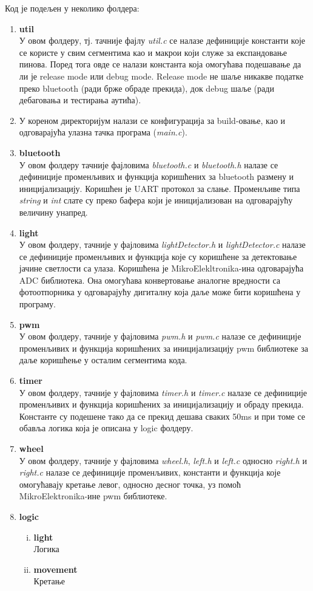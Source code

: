 Код је подељен у неколико фолдера:
\begin{enumerate}[1.]
	\item \textbf{util}\\
	У овом фолдеру, тј. тачније фајлу \textit{util.c} се налазе дефиниције константи које се користе у свим сегментима као и макрои који служе за експандовање пинова. Поред тога овде се налази константа која омогућава подешавање да ли је release mode или debug mode. Release mode не шаље никакве податке преко bluetooth (ради брже обраде прекида), док debug шаље (ради дебаговања и тестирања аутића). 
	\item \textbf{}
		У кореном директоријум налази се конфигурација за build-овање, као и одговарајућа улазна тачка програма (\textit{main.c}). 
	\item \textbf{bluetooth}\\
		У овом фолдеру тачније фајловима \textit{bluetooth.c} и \textit{bluetooth.h} налазе се дефиниције променљивих и функција коришћених за bluetooth размену и иницијализацију. Коришћен је UART протокол за слање. Променљиве типа \textit{string }и \textit{int } слате су преко бафера који је иницијализован на одговарајућу величину унапред.
	\item \textbf{light}\\
	У овом фолдеру, тачније у фајловима \textit{lightDetector.h} и \textit{lightDetector.c} налазе се дефиниције променљивих и функција које су коришћене за детектовање јачине светлости са улаза. Коришћена је MikroElekltronika-ина одговарајућа ADC библиотека. Она омогућава конвертовање аналогне вредности са фотоотпорника у одговарајућу дигиталну која даље може бити коришћена у програму.
	\item \textbf{pwm}\\
		У овом фолдеру, тачније у фајловима \textit{pwm.h} и \textit{pwm.c} налазе се дефиниције променљивих и функција коришћених за иницијализацију pwm библиотеке за даље коришћење у осталим сегментима кода. 
	\item \textbf{timer}\\
	У овом фолдеру, тачније у фајловима \textit{timer.h} и \textit{timer.c} налазе се дефиниције променљивих и функција коришћених за иницијализацију и обраду прекида. Константе су подешене тако да се прекид дешава сваких 50ms и при томе се обавља логика која је описана у logic фолдеру.
	\item \textbf{wheel}\\
	У овом фолдеру, тачније у фајловима \textit{wheel.h}, \textit{left.h} и \textit{left.c} односно \textit{right.h} и \textit{right.c} налазе се дефиниције променљивих, константи и функција које омогућавају кретање левог, односно десног точка, уз помоћ MikroElektronika-ине pwm библиотеке. 
	\item \textbf{logic}\\
		\begin{enumerate}[i)]
			\item \textbf{light}\\
				Логика
			\item \textbf{movement}\\
				Кретање
		\end{enumerate}


\end{enumerate}
